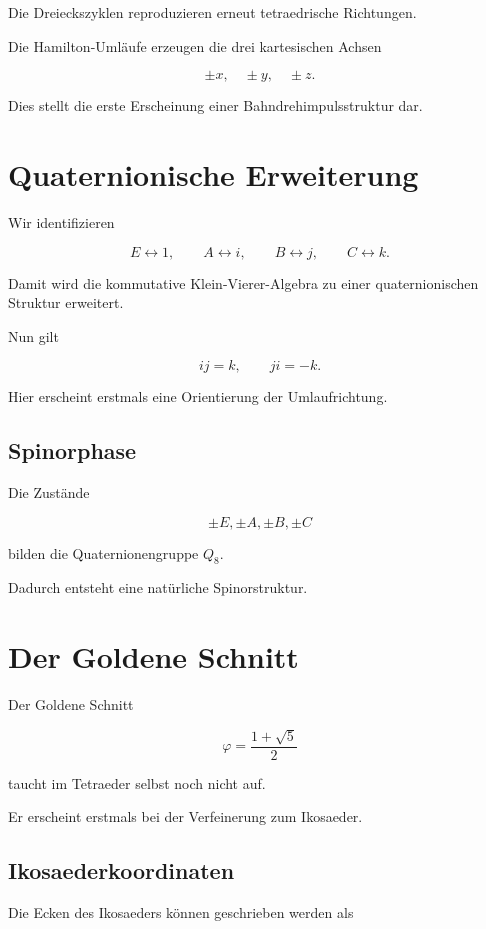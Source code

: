 \documentclass[11pt,a4paper]{article}
\begin{document}
	Die Dreieckszyklen reproduzieren erneut tetraedrische Richtungen.
	
	Die Hamilton-Umläufe erzeugen die drei kartesischen Achsen
	
	\[
	\pm x,\quad \pm y,\quad \pm z.
	\]
	
	Dies stellt die erste Erscheinung einer
	Bahndrehimpulsstruktur dar.
	
	\section{Quaternionische Erweiterung}
	
	Wir identifizieren
	
	\[
	E\leftrightarrow 1,
	\qquad
	A\leftrightarrow i,
	\qquad
	B\leftrightarrow j,
	\qquad
	C\leftrightarrow k.
	\]
	
	Damit wird die kommutative Klein-Vierer-Algebra
	zu einer quaternionischen Struktur erweitert.
	
	Nun gilt
	
	\[
	ij=k,
	\qquad
	ji=-k.
	\]
	
	Hier erscheint erstmals eine Orientierung
	der Umlaufrichtung.
	
	\subsection{Spinorphase}
	
	Die Zustände
	
	\[
	\pm E,\pm A,\pm B,\pm C
	\]
	
	bilden die Quaternionengruppe $Q_8$.
	
	Dadurch entsteht eine natürliche Spinorstruktur.
	
	\section{Der Goldene Schnitt}
	
	Der Goldene Schnitt
	
	\[
	\varphi
	=
	\frac{1+\sqrt5}{2}
	\]
	
	taucht im Tetraeder selbst noch nicht auf.
	
	Er erscheint erstmals bei der Verfeinerung
	zum Ikosaeder.
	
	\subsection{Ikosaederkoordinaten}
	
	Die Ecken des Ikosaeders können geschrieben werden als
	
\end{document}
